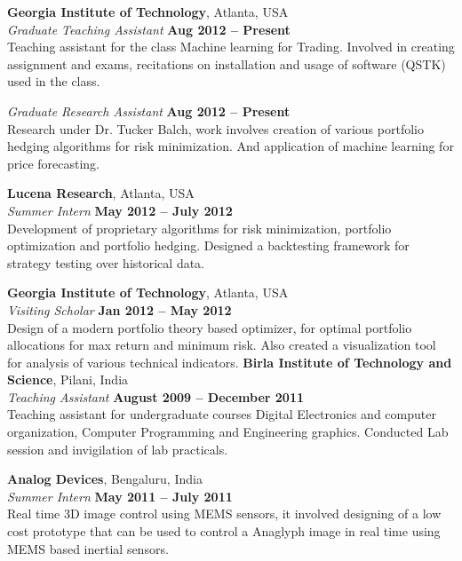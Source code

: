 \documentclass[margin,line]{resume}
\begin{document}
\begin{resume}
    \textbf{Georgia Institute of Technology}, Atlanta, USA \vspace{2mm}\\\vspace{1mm}%
    \textsl{Graduate Teaching Assistant} \hfill \textbf{Aug 2012 -- Present}\\
   Teaching assistant for the class Machine learning for Trading. Involved in creating assignment and exams, recitations on installation and usage of software (QSTK) used in the class. 

    \textsl{Graduate Research Assistant} \hfill \textbf{Aug 2012 -- Present}\\
    Research under Dr. Tucker Balch, work involves creation of various portfolio hedging algorithms for risk minimization. And application of machine learning for price forecasting.

    \textbf{Lucena Research}, Atlanta, USA \vspace{2mm}\\\vspace{1mm}%
    \textsl{Summer Intern} \hfill \textbf{May 2012 -- July 2012}\\
    Development of proprietary algorithms for risk minimization, portfolio optimization and portfolio hedging. Designed a backtesting framework for strategy testing over historical data.

    \textbf{Georgia Institute of Technology}, Atlanta, USA \vspace{2mm}\\\vspace{1mm}%
    \textsl{Visiting Scholar} \hfill \textbf{Jan 2012 -- May 2012}\\
    Design of a modern portfolio theory based optimizer, for optimal portfolio allocations for max return and minimum risk. Also created a visualization tool for analysis of various technical indicators.
\newpage
    \textbf{Birla Institute of Technology and Science}, Pilani, India \vspace{2mm}\\\vspace{1mm}%
    \textsl{Teaching Assistant} \hfill \textbf{August 2009 -- December 2011}\\
    Teaching assistant for undergraduate courses Digital Electronics and computer organization, Computer Programming and Engineering graphics. Conducted Lab session and invigilation of lab practicals.

    \textbf{Analog Devices}, Bengaluru, India \vspace{2mm}\\\vspace{1mm}%
    \textsl{Summer Intern} \hfill \textbf{May 2011 -- July 2011}\\
    Real time 3D image control using MEMS sensors, it involved designing of a low cost prototype that can be used to control a Anaglyph image in real time using MEMS based inertial sensors. 


\end{resume}
\end{document}
